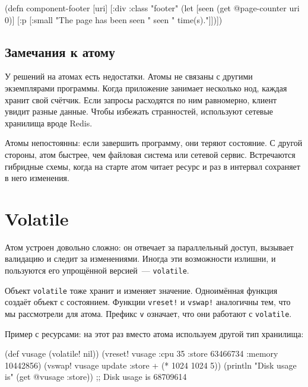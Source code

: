 \else

\begin{english}
  \begin{clojure}
(defn component-footer [uri]
  [:div {:class "footer"}
   (let [seen (get @page-counter uri 0)]
     [:p [:small "The page has been seen " seen " time(s)."]])])
  \end{clojure}
\end{english}

\fi

\subsection{Замечания к атому}

У решений на атомах есть недостатки. Атомы не связаны с другими экземплярами
программы. Когда приложение занимает несколько нод, каждая хранит свой
счётчик. Если запросы расходятся по ним равномерно, клиент увидит разные
данные. Чтобы избежать странностей, используют сетевые хранилища вроде Redis.


Атомы непостоянны: если завершить программу, они теряют состояние. С другой
стороны, атом быстрее, чем файловая система или сетевой сервис. Встречаются
гибридные схемы, когда на старте атом читает ресурс и раз в интервал сохраняет в
него изменения.

\section{Volatile}

Атом устроен довольно сложно: он отвечает за параллельный доступ, вызывает
валидацию и следит за изменениями. Иногда эти возможности излишни, и пользуются
его упрощённой версией~--- \verb|volatile|.


Объект \verb|volatile| тоже хранит и изменяет значение. Одноимённая функция
создаёт объект с состоянием. Функции \verb|vreset!| и \verb|vswap!|
аналогичны тем, что мы рассмотрели для атома. Префикс \verb|v| означает, что
они работают с \verb|volatile|.

Пример с ресурсами: на этот раз вместо атома используем другой тип хранилища:

\ifx\DEVICETYPE\MOBILE

\begin{english}
  \begin{clojure}
(def vusage (volatile! nil))
(vreset! vusage
         {:cpu 35
          :store 63466734
          :memory 10442856})
(vswap! vusage
  update :store + (* 1024 1024 5))
(println
  "Disk usage is" (get @vusage :store))
;; Disk usage is 68709614
  \end{clojure}
\end{english}

